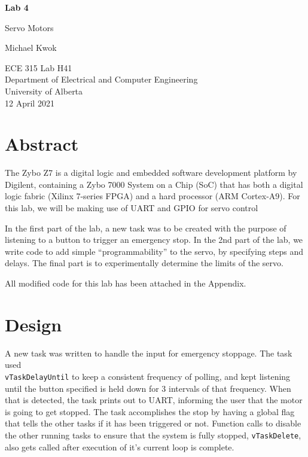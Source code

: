 \documentclass{article}
\begin{document}
\begin{titlepage}
    \begin{center}
        \vspace*{1cm}

        \textbf{\Large{Lab 4}}

        \vspace{0.5cm}

        \LARGE{Servo Motors}

        \vspace{1.5cm}

        Michael Kwok

        \vfill
        \Large{ECE 315 Lab H41\\
            Department of Electrical and Computer Engineering\\
            University of Alberta\\
            12 April 2021}
    \end{center}
\end{titlepage}
\newpage
\section{Abstract}
The Zybo Z7 is a digital logic and embedded software development platform by Digilent, containing a Zybo 7000 System on a Chip (SoC) that has both a digital logic fabric (Xilinx 7-series FPGA) and a hard processor (ARM Cortex-A9). For this lab, we will be making use of UART and GPIO for servo control\@

In the first part of the lab, a new task was to be created with the purpose of listening to a button to trigger an emergency stop. In the 2nd part of the lab, we write code to add simple ``programmability'' to the servo, by specifying steps and delays. The final part is to experimentally determine the limits of the servo.\@

All modified code for this lab has been attached in the Appendix.

\section{Design}
A new task was written to handle the input for emergency stoppage. The task used\\\verb|vTaskDelayUntil| to keep a consistent frequency of polling, and kept listening until the button specified is held down for 3 intervals of that frequency. When that is detected, the task prints out to UART, informing the user that the motor is going to get stopped. The task accomplishes the stop by having a global flag that tells the other tasks if it has been triggered or not. Function calls to disable the other running tasks to ensure that the system is fully stopped, \verb|vTaskDelete|, also gets called after execution of it's current loop is complete.
\end{document}
